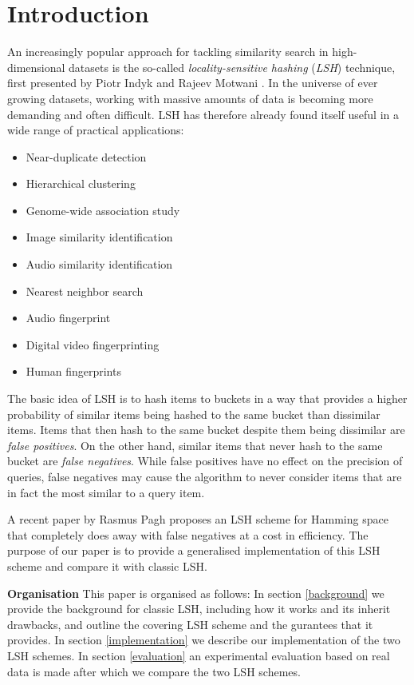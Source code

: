 \section{Introduction}
\label{introduction}

An increasingly popular approach for tackling similarity search in high-dimensional datasets is the so-called \textit{locality-sensitive hashing} (\textit{LSH}) technique, first presented by Piotr Indyk and Rajeev Motwani \cite{DBLP:conf/stoc/IndykM98}. In the universe of ever growing datasets, working with massive amounts of data is becoming more demanding and often difficult. LSH has therefore already found itself useful in a wide range of practical applications:

\begin{itemize}
  \item Near-duplicate detection
  \item Hierarchical clustering
  \item Genome-wide association study
  \item Image similarity identification
  \item Audio similarity identification
  \item Nearest neighbor search
  \item Audio fingerprint
  \item Digital video fingerprinting
  \item Human fingerprints
\end{itemize}

The basic idea of LSH is to hash items to buckets in a way that provides a higher probability of similar items being hashed to the same bucket than dissimilar items. Items that then hash to the same bucket despite them being dissimilar are \textit{false positives}. On the other hand, similar items that never hash to the same bucket are \textit{false negatives}. While false positives have no effect on the precision of queries, false negatives may cause the algorithm to never consider items that are in fact the most similar to a query item.

A recent paper by Rasmus Pagh \cite{DBLP:journals/corr/Pagh15} proposes an LSH scheme for Hamming space that completely does away with false negatives at a cost in efficiency. The purpose of our paper is to provide a generalised implementation of this LSH scheme and compare it with classic LSH.

\textbf{Organisation} This paper is organised as follows: In section \ref{background} we provide the background for classic LSH, including how it works and its inherit drawbacks, and outline the covering LSH scheme and the gurantees that it provides. In section \ref{implementation} we describe our implementation of the two LSH schemes. In section \ref{evaluation} an experimental evaluation based on real data is made after which we compare the two LSH schemes.
